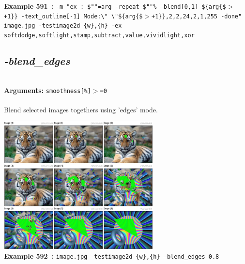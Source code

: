 \documentclass[a4paper,11pt,twoside]{book}
\begin{document}
\begin{center}
{\footnotesize \textbf{Example 591~:} \texttt{-m "ex : \$""=arg -repeat \$""\% --blend[0,1] \$\{arg\{\$$>$+1\}\} -text\_outline[-1] Mode:\textbackslash " \textbackslash "\$\{arg\{\$$>$+1\}\},2,2,24,2,1,255 -done" image.jpg -testimage2d \{w\},\{h\} -ex softdodge,softlight,stamp,subtract,value,vividlight,xor}}
\end{center}

\subsection{\emph{-blend\_edges} }\vspace*{-0.5em}
~\\\textbf{Arguments: } 
{\small \texttt{smoothness[\%]$>$=0}}\\~\\
Blend selected images togethers using 'edges' mode.
\begin{center}\includegraphics[keepaspectratio=true,height=7cm,width=\textwidth]{img/gmic_def592.jpg}\\
{\footnotesize \textbf{Example 592~:} \texttt{image.jpg -testimage2d \{w\},\{h\} --blend\_edges 0.8}}
\end{center}
\end{document}
